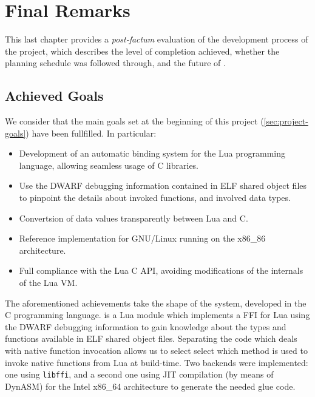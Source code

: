 \cleardoublepage
\setchaptertoc
\chapter{Final Remarks}

This last chapter provides a \emph{post-factum} evaluation of the development
process of the project, which describes the level of completion achieved,
whether the planning schedule was followed through, and the future of \Eol*.
\afterintro

\section{Achieved Goals}

We consider that the main goals set at the beginning of this project
(\autoref{sec:project-goals}) have been fullfilled. In particular:

\begin{itemize}

	\item Development of an automatic binding system for the Lua programming
	language, allowing seamless usage of C libraries.

	\item Use the DWARF debugging information contained in ELF shared object
	files to pinpoint the details about invoked functions, and involved data
	types.

	\item Convertsion of data values transparently between Lua and C.

	\item Reference implementation for GNU/Linux running on the
	x86\_86 architecture.

	\item Full compliance with the Lua C API, avoiding modifications of the
		internals of the Lua VM.

\end{itemize}

The aforementioned achievements take the shape of the \Eol* system, developed
in the C programming language. \Eol* is a Lua module which implements a FFI
for Lua using the DWARF debugging information to gain knowledge about the
types and functions available in ELF shared object files. Separating the code
which deals with native function invocation allows us to select select which
method is used to invoke native functions from Lua at build-time. Two backends
were implemented: one using \verb|libffi|, and a second one using JIT
compilation (by means of DynASM) for the Intel x86\_64 architecture to
generate the needed glue code.


